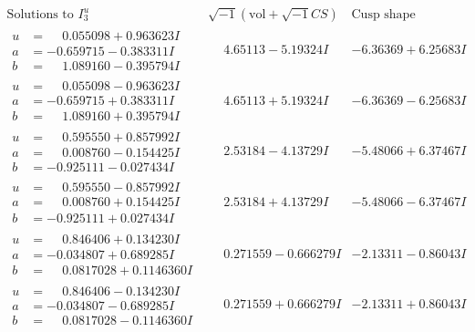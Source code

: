 \documentclass[1p]{elsarticle_modified}
\theoremstyle{definition}
\newcommand{\I}{\sqrt{-1}}
\begin{document}
$$\begin{array}{c|c|c}  
\text{Solutions to }I^u_{3}& \I (\text{vol} + \sqrt{-1}CS) & \text{Cusp shape}\\
 \hline 
\begin{aligned}
u &= \phantom{-}0.055098 + 0.963623 I \\
a &= -0.659715 - 0.383311 I \\
b &= \phantom{-}1.089160 - 0.395794 I\end{aligned}
 & \phantom{-}4.65113 - 5.19324 I & -6.36369 + 6.25683 I \\ \hline\begin{aligned}
u &= \phantom{-}0.055098 - 0.963623 I \\
a &= -0.659715 + 0.383311 I \\
b &= \phantom{-}1.089160 + 0.395794 I\end{aligned}
 & \phantom{-}4.65113 + 5.19324 I & -6.36369 - 6.25683 I \\ \hline\begin{aligned}
u &= \phantom{-}0.595550 + 0.857992 I \\
a &= \phantom{-}0.008760 - 0.154425 I \\
b &= -0.925111 - 0.027434 I\end{aligned}
 & \phantom{-}2.53184 - 4.13729 I & -5.48066 + 6.37467 I \\ \hline\begin{aligned}
u &= \phantom{-}0.595550 - 0.857992 I \\
a &= \phantom{-}0.008760 + 0.154425 I \\
b &= -0.925111 + 0.027434 I\end{aligned}
 & \phantom{-}2.53184 + 4.13729 I & -5.48066 - 6.37467 I \\ \hline\begin{aligned}
u &= \phantom{-}0.846406 + 0.134230 I \\
a &= -0.034807 + 0.689285 I \\
b &= \phantom{-}0.0817028 + 0.1146360 I\end{aligned}
 & \phantom{-}0.271559 - 0.666279 I & -2.13311 - 0.86043 I \\ \hline\begin{aligned}
u &= \phantom{-}0.846406 - 0.134230 I \\
a &= -0.034807 - 0.689285 I \\
b &= \phantom{-}0.0817028 - 0.1146360 I\end{aligned}
 & \phantom{-}0.271559 + 0.666279 I & -2.13311 + 0.86043 I \\ \hline\begin{aligned}

\end{aligned}
\end{array}$$
\end{document}
